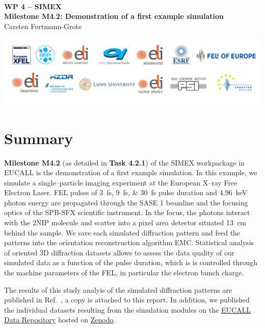 \documentclass[12pt]{scrartcl}
\begin{document}
\makeatletter
\begin{titlepage}
\thispagestyle{scrheadings}
\begin{center}
  $~$\\
  \vspace{2cm}
  \Huge{\textbf{WP 4 -- SIMEX\\[1cm]
    Milestone M4.2: Demonstration of a first example simulation%
  }}\\
  \vspace{2cm}
  \large{ Carsten Fortmann-Grote}
  \vspace{1cm}
  \date{\today}
\end{center}
\vfill%
\includegraphics[width=\textwidth]{figures/PartnerLogos_2017}
\normalfont
\end{titlepage}
\makeatother
%
\tableofcontents
%
\section{Summary}
\textbf{Milestone M4.2} (as detailed in \textbf{Task 4.2.1}) of the SIMEX workpackage in EUCALL is the demonstration of a
first example simulation. In this example, we simulate a single--particle
imaging experiment at the European X--ray Free Electron Laser. FEL pulses of
\SIlist{3;9;30}{\fs} pulse duration and \SI{4.96}{\keV} photon energy are propagated
through the SASE 1 beamline and the focusing optics of the SPB-SFX scientific
instrument. In the focus, the photons interact with the 2NIP molecule and
scatter into a pixel area detector situated \SI{13}{cm} behind the sample. We
save each simulated diffraction pattern and feed the patterns into the
orientation reconstruction algorithm EMC. Statistical analysis of oriented 3D
diffraction datasets allows to assess the data quality of our simulated data as
a function of the pulse duration, which is is controlled through the machine
parameters of the FEL, in particular the electron bunch charge.

The results of this study analyis of the simulated diffraction patterns are published in
Ref.~\cite{Fortmann-Grote2017}, a copy is attached to this report. In addition, we published the individual
datasets resulting from the simulation modules on the
\href{https://zenodo.org/communities/eucall-data}{EUCALL Data Repository} hosted
on \href{https://www.zenodo.org/}{Zenodo}.
\end{document}
